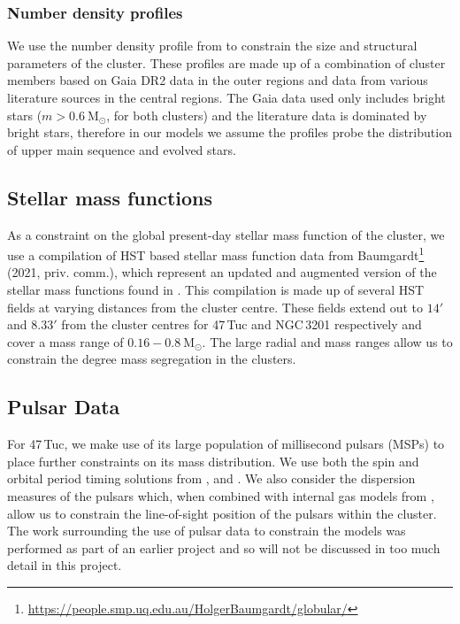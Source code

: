 \subsubsection{Number density profiles}
We use the number density profile from \citet{DeBoer2019} to constrain the size and structural
parameters of the cluster. These profiles are made up of a combination of cluster members based on
Gaia DR2 data in the outer regions and data from various literature sources in the central regions.
The Gaia data used only includes bright stars ($m > 0.6 \ \mathrm{M}_\odot$, for both clusters) and
the literature data is dominated by bright stars, therefore in our models we assume the profiles
probe the distribution of upper main sequence and evolved stars.

\subsection{Stellar mass functions}

As a constraint on the global present-day stellar mass function of the cluster, we use a
compilation of HST based stellar mass function data from
Baumgardt\footnote{\url{https://people.smp.uq.edu.au/HolgerBaumgardt/globular/}} (2021, priv.
comm.), which represent an updated and augmented version of the stellar mass functions found in
\citet{Sollima2017}. This compilation is made up of several HST fields at varying distances from the
cluster centre. These fields extend out to $14 '$ and $8.33 '$ from the cluster centres for 47\,Tuc
and NGC\,3201 respectively and cover a mass range of $0.16 - 0.8 \ \mathrm{M}_\odot$. The large
radial and mass ranges allow us to constrain the degree mass segregation in the clusters.

\subsection{Pulsar Data}

For 47\,Tuc, we make use of its large population of millisecond pulsars (MSPs) to place further
constraints on its mass distribution. We use both the spin and orbital period timing solutions from
\citet{Freire2017}, \citet{Ridolfi2016} and \citet{Freire2018}. We also consider the dispersion
measures of the pulsars which, when combined with internal gas models from \citet{Abbate2018}, allow
us to constrain the line-of-sight position of the pulsars within the cluster. The work surrounding
the use of pulsar data to constrain the models was performed as part of an earlier project and so
will not be discussed in too much detail in this project.



